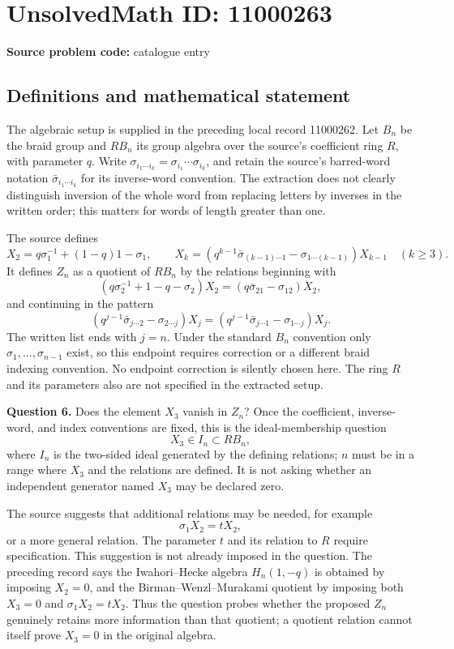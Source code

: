 \documentclass[11pt]{article}
\begin{document}
\section*{UnsolvedMath ID: 11000263}
\textbf{Source problem code:} catalogue entry
\subsection{Definitions and mathematical statement}
The algebraic setup is supplied in the preceding local record 11000262. Let $B_n$ be the braid group and $RB_n$ its group algebra over the source's coefficient ring $R$, with parameter $q$. Write $\sigma_{i_1\cdots i_k}=\sigma_{i_1}\cdots\sigma_{i_k}$, and retain the source's barred-word notation $\bar\sigma_{i_1\cdots i_k}$ for its inverse-word convention. The extraction does not clearly distinguish inversion of the whole word from replacing letters by inverses in the written order; this matters for words of length greater than one.

The source defines
\[
 X_2=q\sigma_1^{-1}+(1-q)1-\sigma_1,\qquad
 X_k=(q^{k-1}\bar\sigma_{(k-1)\cdots1}-\sigma_{1\cdots(k-1)})X_{k-1}\quad(k\ge3).
\]
It defines $Z_n$ as a quotient of $RB_n$ by the relations beginning with
\[
 (q\sigma_2^{-1}+1-q-\sigma_2)X_2
 =(q\bar\sigma_{21}-\sigma_{12})X_2,
\]
and continuing in the pattern
\[
 (q^{j-1}\bar\sigma_{j\cdots2}-\sigma_{2\cdots j})X_j
 =(q^{j-1}\bar\sigma_{j\cdots1}-\sigma_{1\cdots j})X_j.
\]
The written list ends with $j=n$. Under the standard $B_n$ convention only $\sigma_1,\ldots,\sigma_{n-1}$ exist, so this endpoint requires correction or a different braid indexing convention. No endpoint correction is silently chosen here. The ring $R$ and its parameters also are not specified in the extracted setup.

\textbf{Question 6.} Does the element $X_3$ vanish in $Z_n$? Once the coefficient, inverse-word, and index conventions are fixed, this is the ideal-membership question
\[
 X_3\in I_n\subset RB_n,
\]
where $I_n$ is the two-sided ideal generated by the defining relations; $n$ must be in a range where $X_3$ and the relations are defined. It is not asking whether an independent generator named $X_3$ may be declared zero.

The source suggests that additional relations may be needed, for example
\[
 \sigma_1X_2=tX_2,
\]
or a more general relation. The parameter $t$ and its relation to $R$ require specification. This suggestion is not already imposed in the question. The preceding record says the Iwahori--Hecke algebra $H_n(1,-q)$ is obtained by imposing $X_2=0$, and the Birman--Wenzl--Murakami quotient by imposing both $X_3=0$ and $\sigma_1X_2=tX_2$. Thus the question probes whether the proposed $Z_n$ genuinely retains more information than that quotient; a quotient relation cannot itself prove $X_3=0$ in the original algebra.
\end{document}
